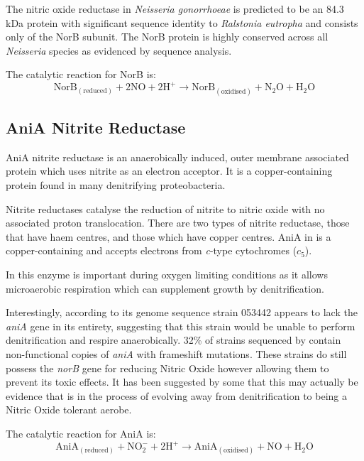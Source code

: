 The nitric oxide reductase in \textit{Neisseria gonorrhoeae} is predicted to be an 84.3 kDa protein with significant sequence identity to \textit{Ralstonia eutropha} and consists only of the NorB subunit\cite{Householder2000}. The NorB protein is highly conserved across all \textit{Neisseria} species as evidenced by sequence analysis\cite{Barth2009}.

The catalytic reaction for NorB is:
\begin{equation}
\mathrm{NorB}_{\mathrm{(reduced)}} + 2\mathrm{NO} + 2\mathrm{H}^+ \rightarrow \mathrm{NorB}_{\mathrm{(oxidised)}} + \mathrm{N}_2\mathrm{O} + \mathrm{H}_2\mathrm{O}
\end{equation}

\subsection{AniA Nitrite Reductase}
AniA nitrite reductase is an anaerobically induced, outer membrane associated protein which uses nitrite as an electron acceptor\cite{Clark1987}. It is a copper-containing protein found in many denitrifying proteobacteria.

Nitrite reductases catalyse the reduction of nitrite to nitric oxide with no associated proton translocation. There are two types of nitrite reductase, those that have haem centres, and those which have copper centres. AniA in \Nm{} is a copper-containing and accepts electrons from \textit{c}-type cytochromes ($c_5$).

In \Nm{} this enzyme is important during oxygen limiting conditions as it allows microaerobic respiration which can supplement growth by denitrification\cite{Rock2005}.

Interestingly, according to its genome sequence \Nm{} strain 053442 appears to lack the \textit{aniA} gene in its entirety, suggesting that this strain would be unable to perform denitrification and respire anaerobically\cite{Barth2009}. 32\% of \Nm{} strains sequenced by \citet{Barth2009} contain non-functional copies of \textit{aniA} with frameshift mutations. These strains do still possess the \textit{norB} gene for reducing Nitric Oxide however allowing them to prevent its toxic effects. It has been suggested by some that this may actually be evidence that \Nsm{} is in the process of evolving away from denitrification to being a Nitric Oxide tolerant aerobe\cite{Moir2011}.

The catalytic reaction for AniA is:
\begin{equation}
\mathrm{AniA}_{\mathrm{(reduced)}} + \mathrm{NO}_2^- + 2\mathrm{H}^+ \rightarrow \mathrm{AniA}_{\mathrm{(oxidised)}} + \mathrm{NO} + \mathrm{H}_2\mathrm{O}
\end{equation}

